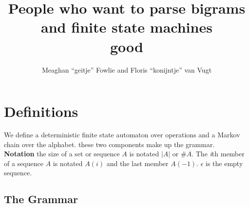 \documentclass[12pt]{article}
\title{People who want to parse bigrams and finite state machines\\good}
\author{Meaghan ``geitje'' Fowlie and Floris ``konijntje'' van Vugt}
\theoremstyle{definition}
\begin{document}
\maketitle

\section{Definitions}

\newcommand\STATES{\ensuremath{\mathbb{S}}}
\newcommand\OPS{\ensuremath{\mathbb{O}}}
\newcommand\BIGR{\ensuremath{\mathbb{B}}}
\newcommand\FSA{\textsc{FSA}}
\newcommand\PARSES{\ensuremath{\mathbb{P}}}
\newcommand\SC{\text{\textsc{sc}}}
\newcommand\TC{\text{\textsc{tc}}}
\newcommand\UC{\text{\textsc{uc}}}
\newcommand\BC{\text{\textsc{bc}}}
\newcommand\N{\ensuremath{\mathbb{N}}}
\newcommand\sg{\ensuremath{\Sigma}}
\newcommand\la{\ensuremath{\langle}}
\newcommand\ra{\ensuremath{\rangle}}
\newcommand\arr{\ensuremath{\rightarrow}}
\newcommand\emp{\ensuremath{\epsilon}}
\newcommand\op{\text{\textsl{op}}}
\newcommand\mg{\text{\textsl{mg}}}
\newcommand\cp{\text{\textsl{copy}}}
\newcommand\cl{\text{\textsl{clear}}}
\newcommand\ed{\text{\textsl{end}}}
\newcommand\expr{\text{\textsl{expr}}}
\newcommand\Lex{\text{\textsl{Lex}}}
\newcommand\fea[1]{\text{\texttt{#1}}}
\newcommand\LBOUND{\ensuremath{\rtimes}}
\newcommand\RBOUND{\ensuremath{\ltimes}}
\newcommand\OURG{\text{\textsc{cath}}}



\newcommand\der{\leftarrow}


We define a deterministic finite state automaton over operations and a Markov chain over the alphabet. these two components make up the grammar. \\

\noindent\textbf{Notation} the size of a set or sequence $A$ is notated $|A|$ or $\#A$. The \textit{i}th member of a sequence $A$ is notated $A(i)$ and the last member $A(-1)$. $\epsilon$ is the empty sequence.


\subsection{The Grammar}
\label{sec:grammar}
\end{document}
